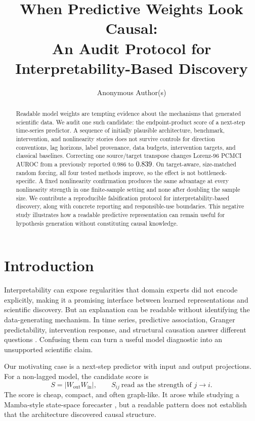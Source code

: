\documentclass{article}
\title{When Predictive Weights Look Causal:\\
An Audit Protocol for Interpretability-Based Discovery}
\author{Anonymous Author(s)}
\begin{document}
\maketitle

\begin{abstract}
Readable model weights are tempting evidence about the mechanisms that
generated scientific data. We audit one such candidate: the endpoint-product
score of a next-step time-series predictor. A sequence of initially plausible
architecture, benchmark, intervention, and nonlinearity stories does not
survive controls for direction conventions, lag horizons, label provenance,
data budgets, intervention targets, and classical baselines. Correcting one
source/target transpose changes Lorenz-96 PCMCI AUROC from a previously
reported $0.986$ to $0.839$. On target-aware, size-matched random forcing,
all four tested methods improve, so the effect is not bottleneck-specific.
A fixed nonlinearity confirmation produces the same advantage at every
nonlinearity strength in one finite-sample setting and none after doubling
the sample size. We contribute a reproducible falsification protocol for
interpretability-based discovery, along with concrete reporting and
responsible-use boundaries. This negative study illustrates how a readable
predictive representation can remain useful for hypothesis generation without
constituting causal knowledge.
\end{abstract}

\section{Introduction}

Interpretability can expose regularities that domain experts did not encode
explicitly, making it a promising interface between learned representations
and scientific discovery. But an explanation can be readable without
identifying the data-generating mechanism. In time series, predictive
association, Granger predictability, intervention response, and structural
causation answer different questions
\citep{granger1969investigating,pearl2009causality,peters2017elements}.
Confusing them can turn a useful model diagnostic into an unsupported
scientific claim.

Our motivating case is a next-step predictor with input and output
projections. For a non-lagged model, the candidate score is
\begin{equation}
  S=|W_{\mathrm{out}}W_{\mathrm{in}}|,\qquad
  S_{ij}\ \text{read as the strength of }j\rightarrow i.
  \label{eq:score}
\end{equation}
The score is cheap, compact, and often graph-like. It arose while studying a
Mamba-style state-space forecaster \citep{gu2023mamba}, but a readable pattern
does not establish that the architecture discovered causal structure.
\end{document}
